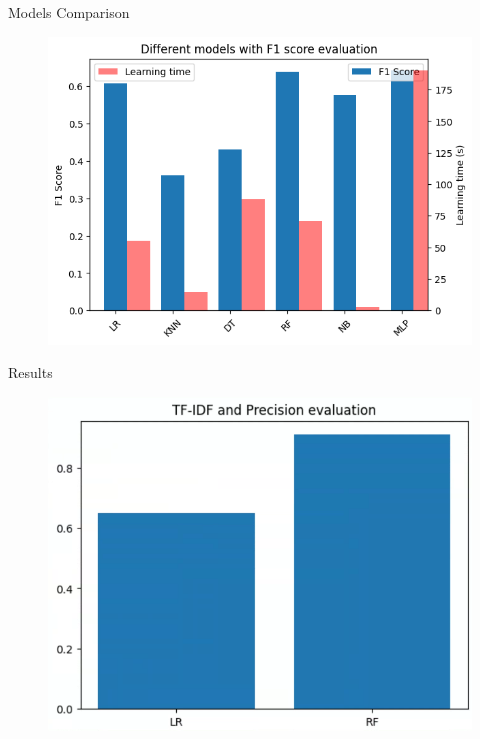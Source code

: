 \documentclass{beamer}
\begin{document}
\begin{frame}[t]{Models Comparison}
	\vspace{-3mm}
	\begin{figure}[h]
		\centering
		\includegraphics[width=0.8\linewidth]{images/models_comparison.png}
	\end{figure}
\end{frame}

\begin{frame}[t]{Results}
	\vspace{-3mm}
	\begin{figure}[h]
		\centering
		\includegraphics[width=0.8\linewidth]{images/result_comparison.png}
	\end{figure}
\end{frame}
\end{document}
